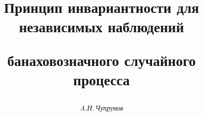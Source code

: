 

 


% 


 


\newcommand{\deq}{\overset{\mathrm{d}}{=}{}} 


\newcommand{\tts}[1]{} 


 




  


\setcounter{page}{83} 












 


\author{\it A.Н.\,Чупрунов} 




\title{Принцип инвариантности для независимых наблюдений 


банаховозначного случайного процесса} 


 


\date{} 




\pagestyle{plain} %


 




\maketitle 



